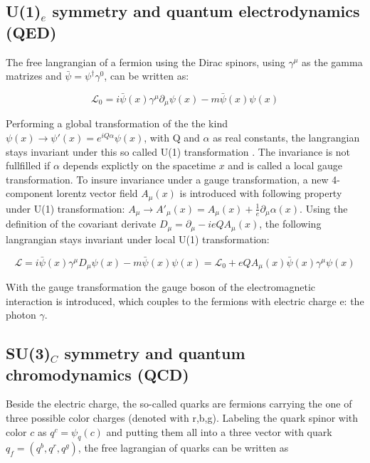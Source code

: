 \subsection{U(1)${_e}$ symmetry and quantum electrodynamics (\acs{QED})}
\label{sec:section_1_1_1}

The free langrangian of a fermion using the Dirac spinors, using $\gamma^{\mu}$ as the gamma matrizes and $\bar{\psi} = \psi^{\dagger}\gamma^{0}$, can be written as:

\begin{equation}
	\label{eq:eq_1_1}
	\mathcal{L}_{0} =  i\bar{\psi}(x)\gamma^{\mu}\partial_{\mu}\psi(x) - m\bar{\psi}(x)\psi(x)
\end{equation}

Performing a global transformation of the the kind $\psi(x) \rightarrow \psi'(x) = e^{iQ\alpha}\psi(x)$, with Q and $\alpha$ as real constants, the langrangian stays invariant under this so called U(1) transformation \cite{SM}. The invariance is not fullfilled if $\alpha$ depends explictly on the spacetime $x$ and is called a local gauge transformation. To insure invariance under a gauge transformation, a new 4-component lorentz vector field $A_{\mu}(x)$ is introduced with following property under U(1) transformation: $A_{\mu} \rightarrow A'_{\mu}(x) = A_{\mu}(x) + \frac{1}{e}\partial_{\mu}\alpha(x)$. Using the definition of the covariant derivate $D_{\mu} = \partial_{\mu} - ieQA_{\mu}(x)$, the following langrangian stays invariant under local U(1) transformation:

\begin{equation}
	\label{eq:eq_1_2}
	\mathcal{L} = i\bar{\psi}(x)\gamma^{\mu}D_{\mu}\psi(x) - m\bar{\psi}(x)\psi(x) = \mathcal{L}_{0} + eQA_{\mu}(x)\bar{\psi}(x)\gamma^{\mu}\psi(x)
\end{equation}

With the gauge transformation the gauge boson of the electromagnetic interaction is introduced, which couples to the fermions with electric charge e: the photon $\gamma$.


\subsection{SU(3)${_C}$ symmetry and quantum chromodynamics (\acs{QCD})}
\label{sec:section_1_1_2}

Beside the electric charge, the so-called quarks are fermions carrying the one of three possible color charges (denoted with r,b,g). Labeling the quark spinor with color $c$ as $q^{c} = \psi_{q}(c)$ and putting them all into a three vector with quark $q_{f} = (q^{b}, q^{r}, q^{g})$, the free lagrangian of quarks can be written as

